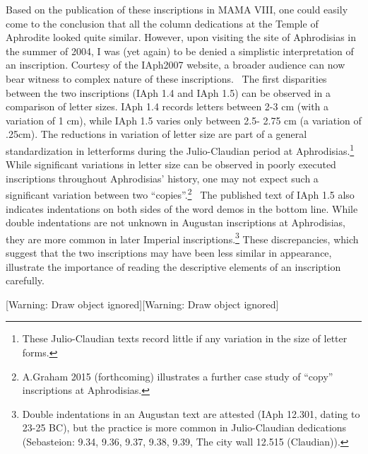 \documentclass[amsthm,ebook]{saparticle}
\begin{document}
Based on the publication of these inscriptions in MAMA VIII, one could easily come to the conclusion that all the column
dedications at the Temple of Aphrodite looked quite similar. However, upon visiting the site of Aphrodisias in the
summer of 2004, I was (yet again) to be denied a simplistic interpretation of an inscription. Courtesy of the IAph2007
website, a broader audience can now bear witness to complex nature of these inscriptions. \ The first disparities
between the two inscriptions (IAph 1.4 and IAph 1.5) can be observed in a comparison of letter sizes. IAph 1.4 records
letters between 2-3 cm (with a variation of 1 cm), while IAph 1.5 varies only between 2.5- 2.75 cm (a variation of
.25cm). The reductions in variation of letter size are part of a general standardization in letterforms during the
Julio-Claudian period at Aphrodisias.\footnote{ These Julio-Claudian texts record little if any variation in the size
of letter forms. } While significant variations in letter size can be observed in poorly executed inscriptions
throughout Aphrodisias’ history, one may not expect such a significant variation between two “copies”.\footnote{
A.Graham 2015 (forthcoming) illustrates a further case study of “copy” inscriptions at Aphrodisias.} \ The published
text of IAph 1.5 also indicates indentations on both sides of the word demos in the bottom line. While double
indentations are not unknown in Augustan inscriptions at Aphrodisias, they are more common in later Imperial
inscriptions.\footnote{ Double indentations in an Augustan text are attested (IAph 12.301, dating to 23-25 BC), but the
practice is more common in Julio-Claudian dedications (Sebasteion: 9.34, 9.36, 9.37, 9.38, 9.39, The city wall 12.515
(Claudian)).} These discrepancies, which suggest that the two inscriptions may have been less similar in appearance,
illustrate the importance of reading the descriptive elements of an inscription carefully. 


\bigskip

[Warning: Draw object ignored][Warning: Draw object ignored]


\bigskip


\bigskip


\bigskip


\bigskip


\bigskip


\bigskip


\bigskip


\bigskip


\bigskip


\bigskip
\end{document}
